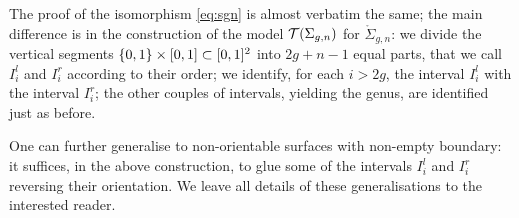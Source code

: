 The proof of the isomorphism \eqref{eq:sgn} is almost verbatim the same; the main difference is in the construction of the
model $\mathcal{T}(\Sigma_{g,n})$ for $\mathring{\Sigma}_{g,n}$: we divide the
vertical segments $\left\{0,1\right\}\times[0,1]\subset[0,1]^2$
into $2g+n-1$ equal parts, that we call $I_i^l$ and $I_i^r$ according to their order;
we identify, for each $i>2g$, the interval $I_i^l$ with the interval $I_i^r$;
the other couples of intervals, yielding the genus, are identified just as before.

One can further generalise to non-orientable surfaces with non-empty boundary: it suffices,
in the above construction, to glue some of the intervals $I_i^l$ and $I_i^r$ reversing their
orientation. We leave all details of these generalisations to the interested reader.